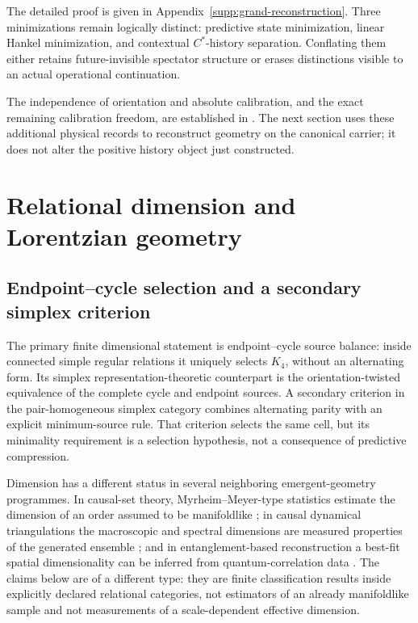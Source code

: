 \documentclass[11pt]{article}
\numberwithin{equation}{section}
\theoremstyle{definition}
\theoremstyle{remark}
\begin{document}
The detailed proof is given in Appendix~\ref{supp:grand-reconstruction}.  Three minimizations
remain logically distinct: predictive state minimization, linear Hankel
minimization, and contextual $C^*$-history separation.  Conflating them either
retains future-invisible spectator structure or erases distinctions visible to
an actual operational continuation.

The independence of orientation and absolute calibration, and the exact
remaining calibration freedom, are established in
.
The next section uses these additional physical records to reconstruct
geometry on the canonical carrier; it does not alter the positive
history object just constructed.


\section{Relational dimension and Lorentzian geometry}
\label{sec:adm-main}

\subsection{Endpoint--cycle selection and a secondary simplex criterion}

The primary finite dimensional statement is endpoint--cycle source balance:
inside connected simple regular relations it uniquely selects $K_4$, without
an alternating form. Its simplex representation-theoretic counterpart is the
orientation-twisted equivalence of the complete cycle and endpoint sources.
A secondary criterion in the pair-homogeneous simplex category combines
alternating parity with an explicit minimum-source rule. That criterion
selects the same cell, but its minimality requirement is a selection
hypothesis, not a consequence of predictive compression.

Dimension has a different status in several neighboring emergent-geometry
programmes.  In causal-set theory, Myrheim--Meyer-type statistics estimate the
dimension of an order assumed to be manifoldlike
\cite{Myrheim1978,Meyer1989,surya}; in causal dynamical triangulations the
macroscopic and spectral dimensions are measured properties of the generated
ensemble \cite{AmbjornJurkiewiczLoll2004,AmbjornJurkiewiczLoll2005}; and in
entanglement-based reconstruction a best-fit spatial dimensionality can be
inferred from quantum-correlation data \cite{CaoCarrollMichalakis2017}.  The
claims below are of a different type: they are finite classification results
inside explicitly declared relational categories, not estimators of an
already manifoldlike sample and not measurements of a scale-dependent
effective dimension.
\end{document}
